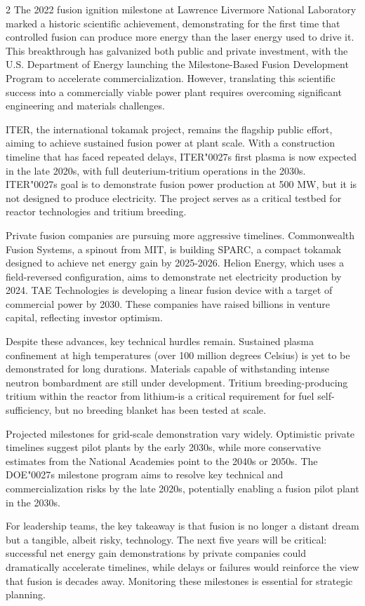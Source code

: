 \documentclass[10pt,a4paper]{article}
\newcommand{\BOApos}{{\BOQuoteFont\char"0027}}
\begin{document}
\begin{multicols}{2}
{\small The 2022 fusion ignition milestone at Lawrence Livermore National Laboratory marked a historic scientific achievement, demonstrating for the first time that controlled fusion can produce more energy than the laser energy used to drive it. This breakthrough has galvanized both public and private investment, with the U.S. Department of Energy launching the Milestone-Based Fusion Development Program to accelerate commercialization. However, translating this scientific success into a commercially viable power plant requires overcoming significant engineering and materials challenges.}\par
{\small ITER, the international tokamak project, remains the flagship public effort, aiming to achieve sustained fusion power at plant scale. With a construction timeline that has faced repeated delays, ITER\BOApos{}s first plasma is now expected in the late 2020s, with full deuterium-tritium operations in the 2030s. ITER\BOApos{}s goal is to demonstrate fusion power production at 500 MW, but it is not designed to produce electricity. The project serves as a critical testbed for reactor technologies and tritium breeding.}\par
{\small Private fusion companies are pursuing more aggressive timelines. Commonwealth Fusion Systems, a spinout from MIT, is building SPARC, a compact tokamak designed to achieve net energy gain by 2025-2026. Helion Energy, which uses a field-reversed configuration, aims to demonstrate net electricity production by 2024. TAE Technologies is developing a linear fusion device with a target of commercial power by 2030. These companies have raised billions in venture capital, reflecting investor optimism.}\par
{\small Despite these advances, key technical hurdles remain. Sustained plasma confinement at high temperatures (over 100 million degrees Celsius) is yet to be demonstrated for long durations. Materials capable of withstanding intense neutron bombardment are still under development. Tritium breeding-producing tritium within the reactor from lithium-is a critical requirement for fuel self-sufficiency, but no breeding blanket has been tested at scale.}\par
{\small Projected milestones for grid-scale demonstration vary widely. Optimistic private timelines suggest pilot plants by the early 2030s, while more conservative estimates from the National Academies point to the 2040s or 2050s. The DOE\BOApos{}s milestone program aims to resolve key technical and commercialization risks by the late 2020s, potentially enabling a fusion pilot plant in the 2030s.}\par
{\small For leadership teams, the key takeaway is that fusion is no longer a distant dream but a tangible, albeit risky, technology. The next five years will be critical: successful net energy gain demonstrations by private companies could dramatically accelerate timelines, while delays or failures would reinforce the view that fusion is decades away. Monitoring these milestones is essential for strategic planning.}\par
\end{multicols}
\label{chap:1:end}
\end{document}
